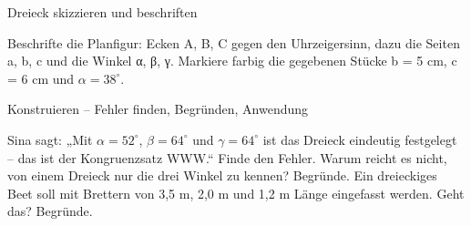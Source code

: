 \begin{aufgabe}{Dreieck skizzieren und beschriften}
\begin{teile}
\teil Beschrifte die Planfigur: Ecken A, B, C gegen den Uhrzeigersinn, dazu die Seiten a, b, c und die Winkel α, β, γ. Markiere farbig die gegebenen Stücke b = 5 cm, c = 6 cm und $\alpha = 38^\circ$.

\end{teile}
\end{aufgabe}

\begin{aufgabe}{Konstruieren – Fehler finden, Begründen, Anwendung}
\begin{teile}
\teil Sina sagt: „Mit $\alpha = 52^\circ$, $\beta = 64^\circ$ und $\gamma = 64^\circ$ ist das Dreieck eindeutig festgelegt – das ist der Kongruenzsatz WWW.“ Finde den Fehler.
\teil Warum reicht es nicht, von einem Dreieck nur die drei Winkel zu kennen? Begründe.
\teil Ein dreieckiges Beet soll mit Brettern von 3,5 m, 2,0 m und 1,2 m Länge eingefasst werden. Geht das? Begründe.
\end{teile}
\end{aufgabe}

